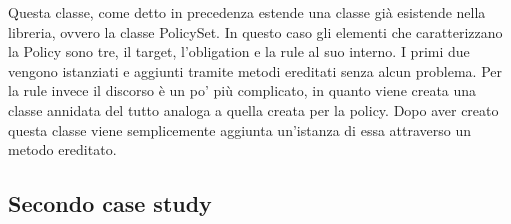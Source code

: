
Questa classe, come detto in precedenza estende una classe già esistende nella libreria, ovvero la classe PolicySet. In questo caso gli elementi che caratterizzano la Policy sono tre, il target, l'obligation e la rule al suo interno. I primi due vengono istanziati e aggiunti tramite metodi ereditati senza alcun problema. Per la rule invece il discorso è un po' più complicato, in quanto viene creata una classe annidata del tutto analoga a quella creata per la policy. Dopo aver creato questa classe viene semplicemente aggiunta un'istanza di essa attraverso un metodo ereditato.



\subsection{Secondo case study}
